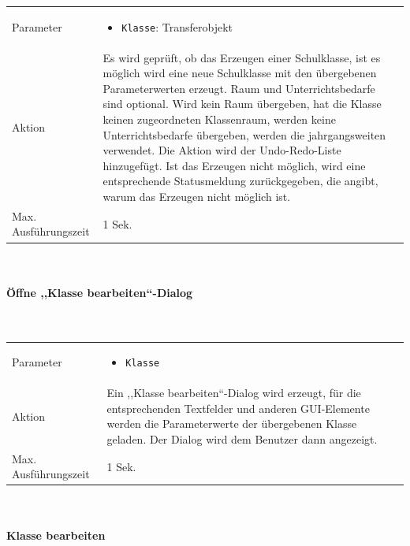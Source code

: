 \documentclass[fontsize=12pt,paper=a4,twoside]{scrartcl}
\begin{document}
\begin{tabularx}{\textwidth}{p{4cm}X}
Parameter & \begin{itemize}[itemsep=0pt, leftmargin = 0.5cm]
			\item \texttt{Klasse}: Transferobjekt
			\end{itemize}\\
Aktion & Es wird geprüft, ob das Erzeugen einer Schulklasse, ist es möglich wird eine neue Schulklasse mit den übergebenen Parameterwerten erzeugt. Raum und Unterrichtsbedarfe sind optional. Wird kein Raum übergeben, hat die Klasse keinen zugeordneten Klassenraum, werden keine Unterrichtsbedarfe übergeben, werden die jahrgangsweiten verwendet. Die Aktion wird der Undo-Redo-Liste hinzugefügt. Ist das Erzeugen nicht möglich, wird eine entsprechende Statusmeldung zurückgegeben, die angibt, warum das Erzeugen nicht möglich ist.\\
Max. Ausführungszeit & 1 Sek. 
\end{tabularx}\\


\paragraph{Öffne ,,Klasse bearbeiten``-Dialog}\mbox{}\\

\begin{tabularx}{\textwidth}{p{4cm}X}
Parameter & \begin{itemize}[itemsep=0pt, leftmargin = 0.5cm]
			\item \texttt{Klasse}
			\end{itemize}\\
Aktion & Ein ,,Klasse bearbeiten``-Dialog wird erzeugt, für die entsprechenden Textfelder und anderen GUI-Elemente werden die Parameterwerte der übergebenen Klasse geladen. Der Dialog wird dem Benutzer dann angezeigt.\\
Max. Ausführungszeit & 1 Sek. 
\end{tabularx}\\


\paragraph{Klasse bearbeiten}\mbox{}\\
\end{document}

